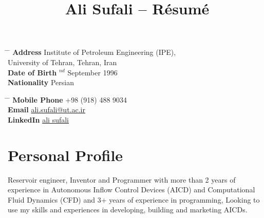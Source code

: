 \documentclass[10pt]{article} %
\begin{document}

\title{Ali Sufali -- Résumé} %


\parbox{0.5\textwidth}{ %
\begin{tabbing} %
\hspace{3cm} \= \hspace{4cm} \= \kill %
{\bf Address} \> Institute of Petroleum Engineering (IPE), \\ %
\> University of Tehran, Tehran, Iran \\ %
{\bf Date of Birth} $^{nd}$ September 1996 \\ %
{\bf Nationality} \> Persian %
\end{tabbing}}
\hfill %
\parbox{0.5\textwidth}{ %
\begin{tabbing} %
\hspace{3cm} \= \hspace{4cm} \= \kill %
{\bf Mobile Phone} \> +98 (918) 488 9034 \\ %
{\bf Email} \> \href{mailto:ali.sufali@ut.ac.ir}{ali.sufali@ut.ac.ir} \\ %
{\bf LinkedIn} \> \href{https://www.linkedin.com/in/ali-sufali/}{ali sufali}
\end{tabbing}}



\section{Personal Profile}

Reservoir engineer, Inventor and Programmer with more than 2 years of experience in Autonomous Inflow Control Devices (AICD) and Computational Fluid Dynamics (CFD) and 3+ years of experience in programming, Looking to use my skills and experiences in developing, building and marketing AICDs.
\end{document}

